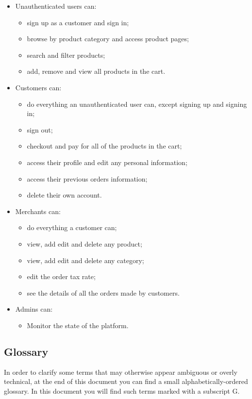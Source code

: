 \begin{itemize}
\item Unauthenticated users can:
\begin{itemize}
\item sign up as a customer and sign in;
\item browse by product category and access product pages;
\item search and filter products;
\item add, remove and view all products in the cart.
\end{itemize}
\item Customers can:
\begin{itemize}
\item do everything an unauthenticated user can, except signing up and signing in;
\item sign out;
\item checkout and pay for all of the products in the cart;
\item access their profile and edit any personal information;
\item access their previous orders information;
\item delete their own account.
\end{itemize}
\item Merchants can:
\begin{itemize}
\item do everything a customer can;
\item view, add edit and delete any product;
\item view, add edit and delete any category;
\item edit the order tax rate;
\item see the details of all the orders made by customers.
\end{itemize}
\item Admins can:
\begin{itemize}
\item Monitor the state of the platform.
\end{itemize}
\end{itemize}
\subsection{Glossary}
In order to clarify some terms that may otherwise appear ambiguous or overly technical, at the end of this document you can find a small alphabetically-ordered glossary. In this document you will find such terms marked with a subscript G.

